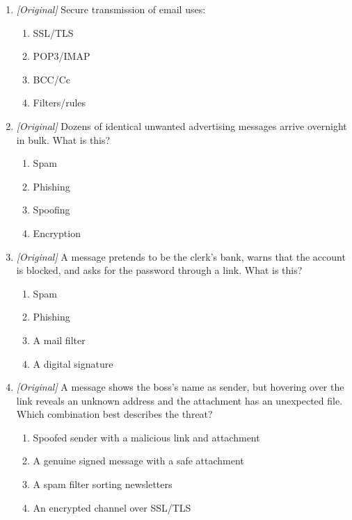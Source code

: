 \documentclass[11pt]{article}
\begin{document}
\begin{enumerate}[label=\textbf{Q\arabic*.}, leftmargin=*]
\begin{enumerate}[label=\Alph*.]
    \item I and II only
    \item II and III only
    \item I, II, and III
  \end{enumerate}
\item \textit{[Original]} Secure transmission of email uses:
  \begin{enumerate}[label=\Alph*.]
    \item SSL/TLS
    \item POP3/IMAP
    \item BCC/Cc
    \item Filters/rules
  \end{enumerate}
\item \textit{[Original]} Dozens of identical unwanted advertising messages
  arrive overnight in bulk. What is this?
  \begin{enumerate}[label=\Alph*.]
    \item Spam
    \item Phishing
    \item Spoofing
    \item Encryption
  \end{enumerate}
\item \textit{[Original]} A message pretends to be the clerk's bank, warns
  that the account is blocked, and asks for the password through a link.
  What is this?
  \begin{enumerate}[label=\Alph*.]
    \item Spam
    \item Phishing
    \item A mail filter
    \item A digital signature
  \end{enumerate}
\item \textit{[Original]} A message shows the boss's name as sender, but
  hovering over the link reveals an unknown address and the attachment has
  an unexpected file. Which combination best describes the threat?
  \begin{enumerate}[label=\Alph*.]
    \item Spoofed sender with a malicious link and attachment
    \item A genuine signed message with a safe attachment
    \item A spam filter sorting newsletters
    \item An encrypted channel over SSL/TLS
  \end{enumerate}


\end{enumerate}
\end{document}
